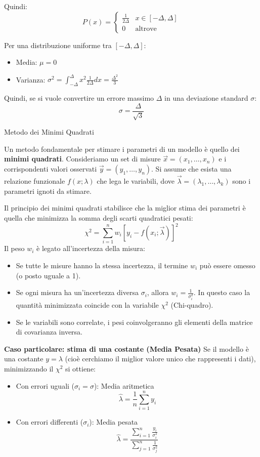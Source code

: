 \documentclass[openany,a4paper,12pt]{book}
\theoremstyle{remark}
\begin{document}
Quindi:
\[ P(x) = \begin{cases} \frac{1}{2\Delta} & x \in [-\Delta, \Delta] \\ 0 & \text{altrove} \end{cases} \]

Per una distribuzione uniforme tra $[-\Delta, \Delta]$:
\begin{itemize}
    \item Media: $\mu = 0$
    \item Varianza: $\sigma^2 = \int_{-\Delta}^{\Delta} x^2 \frac{1}{2\Delta} dx = \frac{\Delta^2}{3}$
\end{itemize}
Quindi, se si vuole convertire un errore massimo $\Delta$ in una deviazione standard $\sigma$:
\begin{equation}
    \sigma = \frac{\Delta}{\sqrt{3}}
\end{equation}

\begin{bressan}{Metodo dei Minimi Quadrati}

Un metodo fondamentale per stimare i parametri di un modello è quello dei \textbf{minimi quadrati}. 
Consideriamo un set di misure $\vec{x}=(x_1, \dots, x_n)$ e i corrispondenti valori osservati $\vec{y}=(y_1, \dots, y_n)$. Si assume che esista una relazione funzionale $f(x; \lambda)$ che lega le variabili, dove $\vec{\lambda} = (\lambda_1, \dots, \lambda_k)$ sono i parametri ignoti da stimare.

Il principio dei minimi quadrati stabilisce che la miglior stima dei parametri è quella che minimizza la somma degli scarti quadratici pesati:
\[
\chi^2 = \sum_{i=1}^{n} w_i \left[ y_i - f(x_i; \vec{\lambda}) \right]^2
\]
Il peso $w_i$ è legato all'incertezza della misura:
\begin{itemize}
    \item Se tutte le misure hanno la stessa incertezza, il termine $w_i$ può essere omesso (o posto uguale a 1).
    \item Se ogni misura ha un'incertezza diversa $\sigma_i$, allora $w_i = \frac{1}{\sigma_i^2}$. In questo caso la quantità minimizzata coincide con la variabile $\chi^2$ (Chi-quadro).
    \item Se le variabili sono correlate, i pesi coinvolgeranno gli elementi della matrice di covarianza inversa.
\end{itemize}

\textbf{Caso particolare: stima di una costante (Media Pesata)}
Se il modello è una costante $y = \lambda$ (cioè cerchiamo il miglior valore unico che rappresenti i dati), minimizzando il $\chi^2$ si ottiene:
\begin{itemize}
    \item Con errori uguali ($\sigma_i = \sigma$): Media aritmetica
    \[ \hat{\lambda} = \frac{1}{n} \sum_{i=1}^n y_i \]
    \item Con errori differenti ($\sigma_i$): Media pesata
    \[ \hat{\lambda} = \frac{\sum_{i=1}^n \frac{y_i}{\sigma_i^2}}{\sum_{j=1}^{n}\frac{1}{\sigma_j^2}} \]
\end{itemize}
\end{bressan}
\end{document}
